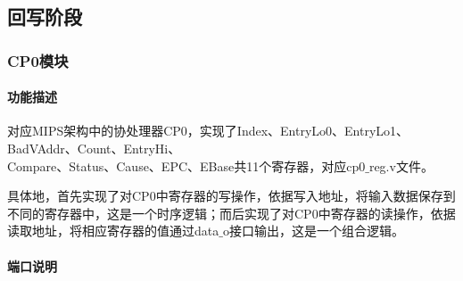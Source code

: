 \subsection{回写阶段}
\subsubsection{CP0模块}
\paragraph{功能描述}
\quad

\quad

对应MIPS架构中的协处理器CP0，实现了Index、EntryLo0、EntryLo1、BadVAddr、Count、EntryHi、\\
Compare、Status、Cause、EPC、EBase共11个寄存器，对应cp0$\_$reg.v文件。

具体地，首先实现了对CP0中寄存器的写操作，依据写入地址，将输入数据保存到不同的寄存器中，这是一个时序逻辑；而后实现了对CP0中寄存器的读操作，依据读取地址，将相应寄存器的值通过data$\_$o接口输出，这是一个组合逻辑。
\paragraph{端口说明}
\quad

